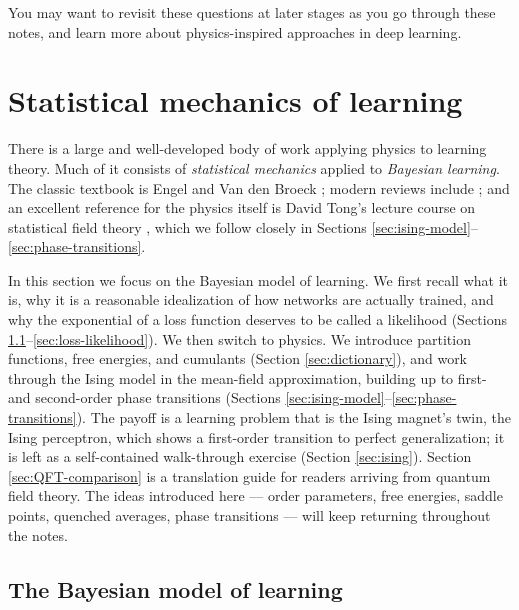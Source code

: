 \documentclass[11pt]{article}
\begin{document}
\noindent You may want to revisit these questions at later stages as you go through these notes, and learn more about physics-inspired approaches in deep learning.




\section{Statistical mechanics of learning}
\label{sec:statmech}

There is a large and well-developed body of work applying physics to learning theory. Much of it consists of \emph{statistical mechanics} applied to \emph{Bayesian learning}. The classic textbook is Engel and Van den Broeck \cite{engel2001statistical}; modern reviews include \cite{zdeborova2016statistical,bahri2020statistical}; and an excellent reference for the physics itself is David Tong's lecture course on statistical field theory \cite{TongSFT}, which we follow closely in Sections \ref{sec:ising-model}--\ref{sec:phase-transitions}.

In this section we focus on the Bayesian model of learning. We first recall what it is, why it is a reasonable idealization of how networks are actually trained, and why the exponential of a loss function deserves to be called a likelihood (Sections \ref{sec:Bayes}--\ref{sec:loss-likelihood}). We then switch to physics. We introduce partition functions, free energies, and cumulants (Section \ref{sec:dictionary}), and work through the Ising model in the mean-field approximation, building up to first- and second-order phase transitions (Sections \ref{sec:ising-model}--\ref{sec:phase-transitions}). The payoff is a learning problem that is the Ising magnet's twin, the Ising perceptron, which shows a first-order transition to perfect generalization; it is left as a self-contained walk-through exercise (Section \ref{sec:ising}). Section \ref{sec:QFT-comparison} is a translation guide for readers arriving from quantum field theory. The ideas introduced here --- order parameters, free energies, saddle points, quenched averages, phase transitions --- will keep returning throughout the notes.

\subsection{The Bayesian model of learning}
\label{sec:Bayes}
\end{document}

